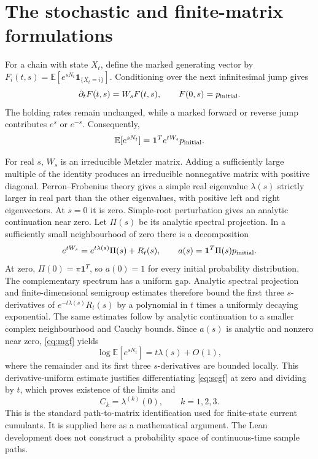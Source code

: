 \documentclass[11pt,a4paper]{article}
\numberwithin{equation}{section}
\theoremstyle{remark}
\newcommand{\E}{\mathbb E}
\begin{document}
\section{The stochastic and finite-matrix formulations}\label{sec:stochastic}

For a chain with state $X_t$, define the marked generating vector by
$F_i(t,s)=\E[e^{sN_t}\mathbf1_{\{X_t=i\}}]$. Conditioning over the next
infinitesimal jump gives
\[
  \partial_tF(t,s)=W_sF(t,s),\qquad F(0,s)=p_{\rm initial}.
\]
The holding rates remain unchanged, while a marked forward or reverse jump
contributes $e^s$ or $e^{-s}$. Consequently,
\begin{equation}\label{eq:mgf}
  \E[e^{sN_t}]=\mathbf1^T e^{tW_s}p_{\rm initial}.
\end{equation}

For real $s$, $W_s$ is an irreducible Metzler matrix. Adding a sufficiently
large multiple of the identity produces an irreducible nonnegative matrix
with positive diagonal. Perron--Frobenius theory gives a simple real
eigenvalue $\lambda(s)$ strictly larger in real part than the other
eigenvalues, with positive left and right eigenvectors. At $s=0$ it is zero.
Simple-root perturbation gives an analytic continuation near zero. Let
$\Pi(s)$ be its analytic spectral projection. In a sufficiently small
neighbourhood of zero there is a decomposition
\[
 e^{tW_s}=e^{t\lambda(s)}\Pi(s)+R_t(s),\qquad
 a(s)=\mathbf1^T\Pi(s)p_{\rm initial}.
\]
At zero, $\Pi(0)=\pi\mathbf1^T$, so $a(0)=1$ for every initial probability
distribution. The complementary spectrum has a uniform gap. Analytic
spectral projection and finite-dimensional semigroup estimates therefore
bound the first three $s$-derivatives of $e^{-t\lambda(s)}R_t(s)$ by a
polynomial in $t$ times a uniformly decaying exponential. The same estimates
follow by analytic continuation to a smaller complex neighbourhood and
Cauchy bounds. Since $a(s)$ is analytic and nonzero near zero,
\eqref{eq:mgf} yields
\begin{equation}\label{eq:scgf}
  \log\E[e^{sN_t}]=t\lambda(s)+O(1),
\end{equation}
where the remainder and its first three $s$-derivatives are bounded locally.
This derivative-uniform estimate justifies differentiating
\eqref{eq:scgf} at zero and dividing by $t$, which proves existence of the
limits and
\begin{equation}\label{eq:identification}
  C_k=\lambda^{(k)}(0),\qquad k=1,2,3.
\end{equation}
This is the standard path-to-matrix identification used for finite-state
current cumulants. It is supplied here as a mathematical argument. The
Lean development does not construct a probability space of continuous-time
sample paths.
\end{document}
